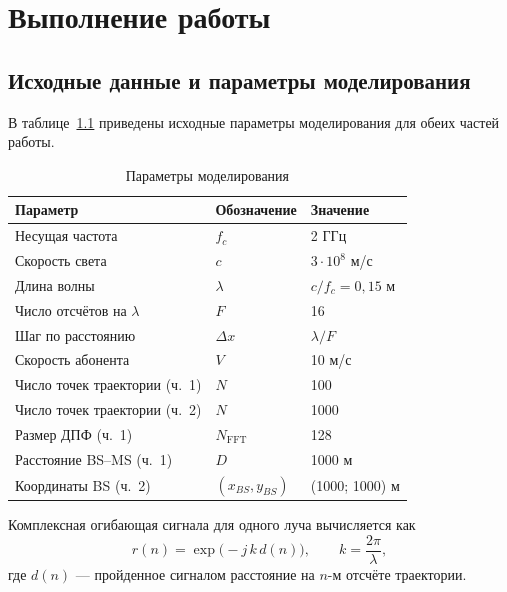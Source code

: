 \chapter{Выполнение работы}
\label{ch:chapter_radio}

\section{Исходные данные и параметры моделирования}

В таблице~\ref{tab:params} приведены исходные параметры моделирования
для обеих частей работы.

\begin{table}[h]
    \caption{Параметры моделирования}
    \label{tab:params}
    \centering
    \begin{tabular}{lll}
        \toprule
        Параметр & Обозначение & Значение \\
        \midrule
        Несущая частота              & $f_c$        & 2 ГГц \\
        Скорость света               & $c$          & $3\cdot10^8$ м/с \\
        Длина волны                  & $\lambda$    & $c/f_c = 0{,}15$ м \\
        Число отсчётов на $\lambda$  & $F$          & 16 \\
        Шаг по расстоянию            & $\Delta x$   & $\lambda/F$ \\
        Скорость абонента            & $V$          & 10 м/с \\
        Число точек траектории (ч.~1) & $N$         & 100 \\
        Число точек траектории (ч.~2) & $N$         & 1000 \\
        Размер ДПФ (ч.~1)            & $N_{\text{FFT}}$ & 128 \\
        Расстояние BS--MS (ч.~1)     & $D$          & 1000 м \\
        Координаты BS (ч.~2)         & $(x_{BS},y_{BS})$ & (1000; 1000) м \\
        \bottomrule
    \end{tabular}
\end{table}

Комплексная огибающая сигнала для одного луча вычисляется как
\begin{equation}
    r(n) = \exp\!\bigl(-j\,k\,d(n)\bigr), \qquad k = \frac{2\pi}{\lambda},
    \label{eq:envelope}
\end{equation}
где $d(n)$ — пройденное сигналом расстояние на $n$-м отсчёте траектории.

